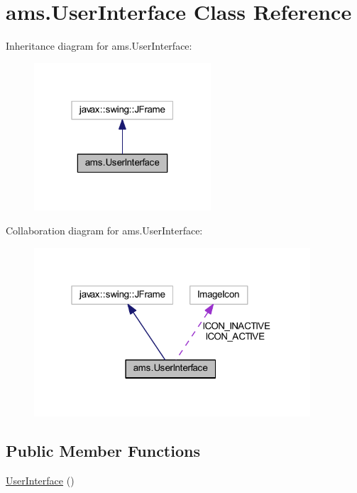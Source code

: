 \hypertarget{classams_1_1_user_interface}{}\section{ams.\+User\+Interface Class Reference}
\label{classams_1_1_user_interface}


Inheritance diagram for ams.\+User\+Interface\+:\nopagebreak
\begin{figure}[H]
\begin{center}
\leavevmode
\includegraphics[width=187pt]{classams_1_1_user_interface__inherit__graph}
\end{center}
\end{figure}


Collaboration diagram for ams.\+User\+Interface\+:\nopagebreak
\begin{figure}[H]
\begin{center}
\leavevmode
\includegraphics[width=292pt]{classams_1_1_user_interface__coll__graph}
\end{center}
\end{figure}
\subsection*{Public Member Functions}
\begin{DoxyCompactItemize}
\item 
\mbox{\hyperlink{classams_1_1_user_interface_aee729eb579067256175a86f3da2e37bc}{User\+Interface}} ()
\end{DoxyCompactItemize}
